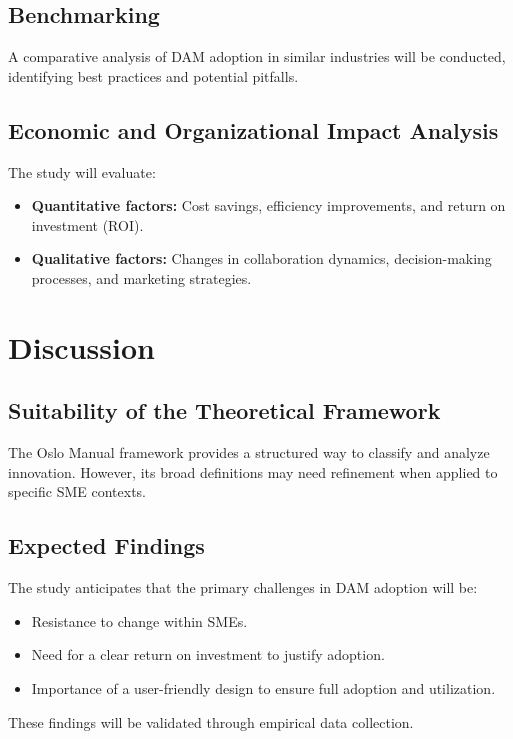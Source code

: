 \documentclass[a4paper,12pt,twocolumn]{article}
\begin{document}
\subsection{Benchmarking}
A comparative analysis of DAM adoption in similar industries will be conducted, identifying best practices and potential pitfalls.

\subsection{Economic and Organizational Impact Analysis}
The study will evaluate:
\begin{itemize}
    \item \textbf{Quantitative factors:} Cost savings, efficiency improvements, and return on investment (ROI).
    \item \textbf{Qualitative factors:} Changes in collaboration dynamics, decision-making processes, and marketing strategies.
\end{itemize}

\section{Discussion}
\subsection{Suitability of the Theoretical Framework}
The Oslo Manual framework provides a structured way to classify and analyze innovation. However, its broad definitions may need refinement when applied to specific SME contexts.

\subsection{Expected Findings}
The study anticipates that the primary challenges in DAM adoption will be:
\begin{itemize}
    \item Resistance to change within SMEs.
    \item Need for a clear return on investment to justify adoption.
    \item Importance of a user-friendly design to ensure full adoption and utilization.
\end{itemize}

These findings will be validated through empirical data collection.

\end{document}
